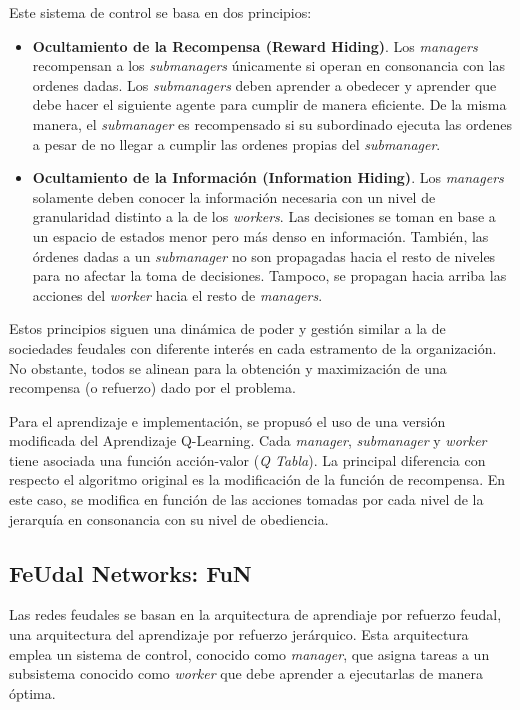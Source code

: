 \documentclass[letterpaper]{article} %
\begin{document}
Este sistema de control se basa en dos principios:
\begin{itemize}
    \item \textbf{Ocultamiento de la Recompensa (Reward Hiding)}. Los \textit{managers} recompensan a los \textit{submanagers} únicamente si operan 
    en consonancia con las ordenes dadas. Los \textit{submanagers} deben aprender a obedecer y aprender que debe hacer el siguiente agente para 
    cumplir de manera eficiente. De la misma manera, el \textit{submanager} es recompensado si su subordinado ejecuta las ordenes a pesar de no llegar a cumplir 
    las ordenes propias del \textit{submanager}.

    \item \textbf{Ocultamiento de la Información (Information Hiding)}. Los \textit{managers} solamente deben conocer la información necesaria 
    con un nivel de granularidad distinto a la de los \textit{workers}. Las decisiones se toman en base a un espacio de estados menor pero más
    denso en información. También, las órdenes dadas a un \textit{submanager} no son propagadas hacia el resto de niveles para no afectar la toma
    de decisiones. Tampoco, se propagan hacia arriba las acciones del \textit{worker} hacia el resto de \textit{managers}. 
\end{itemize}

Estos principios siguen una dinámica de poder y gestión similar a la de sociedades feudales con diferente interés en cada estramento de la organización.
No obstante, todos se alinean para la obtención y maximización de una recompensa (o refuerzo) dado por el problema.

Para el aprendizaje e implementación, se propusó el uso de una versión modificada del Aprendizaje Q-Learning. Cada \textit{manager}, \textit{submanager} y
\textit{worker} tiene asociada una función acción-valor (\textit{Q Tabla}). La principal diferencia con respecto el algoritmo original es la 
modificación de la función de recompensa. En este caso, se modifica en función de las acciones tomadas por cada nivel de la jerarquía en consonancia 
con su nivel de obediencia. 

\subsection{FeUdal Networks: FuN}

Las redes feudales se basan en la arquitectura de aprendiaje por refuerzo feudal, 
una arquitectura del aprendizaje por refuerzo jerárquico. Esta arquitectura emplea un sistema de control, conocido
como \textit{manager}, que asigna tareas a un subsistema conocido como \textit{worker} que debe aprender a ejecutarlas de manera óptima.
\end{document}
